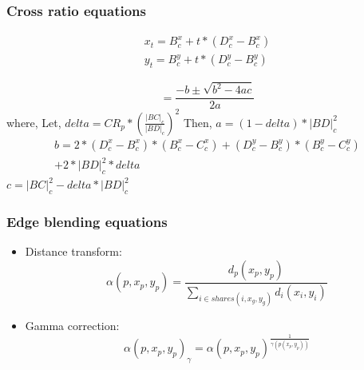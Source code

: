 \documentclass{beamer}
\begin{document}
\appendix


\begin{frame}[label=crossrat]
\frametitle{Cross ratio equations}
\begin{equation}
\begin{aligned}
x_t=B_c^x+t*(D_c^x-B_c^x)\\
y_t=B_c^y+t*(D_c^y-B_c^y)
\end{aligned}
\end{equation}

\begin{equation}
[t_1,t_2]=\frac{-b\pm\sqrt{b^{2}-4ac}}{2a} 
\end{equation}
where,\newline
Let,\newline
$delta={CR_p*(\frac{|BC|_c}{|BD|_c})}^2$\newline
Then,\newline
$a=(1-delta)*|BD|_c^2$
\begin{eqnarray*}
b=2*{(D_c^x-B_c^x)*(B_c^x-C_c^x)+(D_c^y-B_c^y)*(B_c^y-C_c^y)}\\+2*|BD|_c^{2}*delta
\end{eqnarray*}
$c=|BC|_c^2-delta*|BD|_c^2$

\end{frame}


\begin{frame}[label=distform]
\frametitle{Edge blending equations}
\begin{itemize}
\item Distance transform:
\begin{equation}
\alpha(p,x_p,y_p)=\frac{d_p(x_p,y_p)}{\sum\nolimits_{i \in shares(i,x_g,y_g)} d_i(x_i,y_i)}
\end{equation}
\item Gamma correction:
\begin{equation}
\alpha(p,x_p,y_p)_\gamma=\alpha(p,x_p,y_p)^{\frac{1}{\gamma(p(x_p,y_p))}}
\end{equation}
\end{itemize}

\end{frame}

\end{document}
